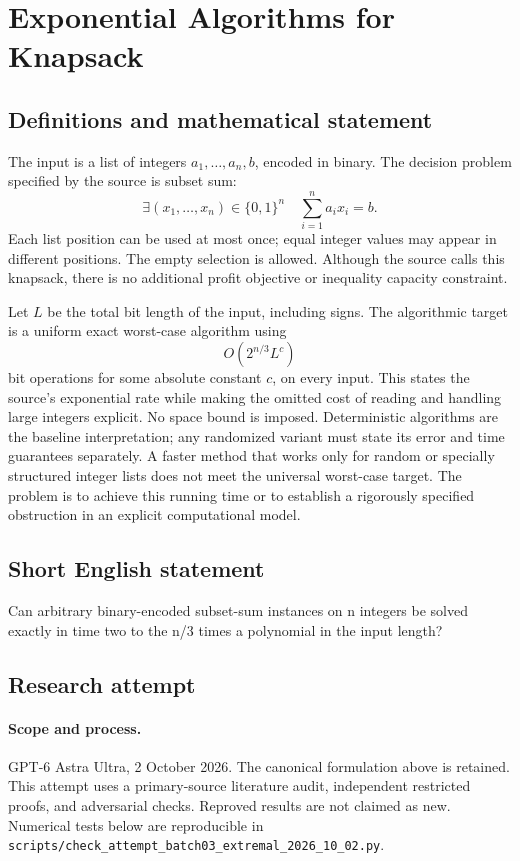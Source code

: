 \documentclass[11pt,a4paper]{article}
\begin{document}
\section*{Exponential Algorithms for Knapsack}\label{statement}

\subsection{Definitions and mathematical statement}
The input is a list of integers $a_1,\ldots,a_n,b$, encoded in binary.
The decision problem specified by the source is subset sum:
\[
 \exists (x_1,\ldots,x_n)\in\{0,1\}^n\quad
                        \sum_{i=1}^n a_ix_i=b.
\]
Each list position can be used at most once; equal integer values
may appear in different positions. The empty selection is allowed.
Although the source calls this knapsack, there is no additional
profit objective or inequality capacity constraint.

Let $L$ be the total bit length of the input, including signs. The
algorithmic target is a uniform exact worst-case algorithm using
\[
                            O(2^{n/3}L^c)
\]
bit operations for some absolute constant $c$, on every input.
This states the source's exponential rate while making the omitted
cost of reading and handling large integers explicit. No space bound
is imposed. Deterministic algorithms are the baseline interpretation;
any randomized variant must state its error and time guarantees
separately. A faster method that works only for random or specially
structured integer lists does not meet the universal worst-case
target. The problem is to achieve this running time or to establish
a rigorously specified obstruction in an explicit computational model.
\subsection{Short English statement}
Can arbitrary binary-encoded subset-sum instances on n integers be solved exactly in time two to the n/3 times a polynomial in the input length?
\subsection{Research attempt}
\paragraph{Scope and process.}
GPT-6 Astra Ultra, 2 October 2026. The canonical formulation above is retained. This attempt uses a primary-source literature audit, independent restricted proofs, and adversarial checks. Reproved results are not claimed as new. Numerical tests below are reproducible in \texttt{scripts/check\_attempt\_batch03\_extremal\_2026\_10\_02.py}.
\end{document}
